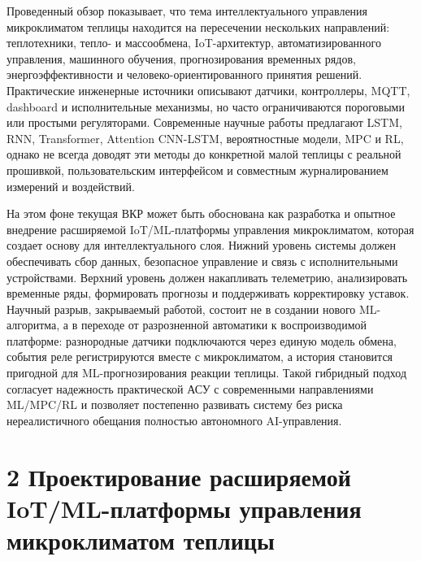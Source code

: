 \documentclass[a4paper,14pt]{extarticle}
\begin{document}
Проведенный обзор показывает, что тема интеллектуального управления
микроклиматом теплицы находится на пересечении нескольких направлений:
теплотехники, тепло- и массообмена, IoT-архитектур, автоматизированного
управления, машинного обучения, прогнозирования временных рядов,
энергоэффективности и человеко-ориентированного принятия решений.
Практические инженерные источники описывают датчики, контроллеры, MQTT,
dashboard и исполнительные механизмы, но часто ограничиваются пороговыми
или простыми регуляторами. Современные научные работы предлагают LSTM,
RNN, Transformer, Attention CNN-LSTM, вероятностные модели, MPC и RL,
однако не всегда доводят эти методы до конкретной малой теплицы с
реальной прошивкой, пользовательским интерфейсом и совместным
журналированием измерений и воздействий.

На этом фоне текущая ВКР может быть обоснована как разработка и опытное
внедрение расширяемой IoT/ML-платформы управления микроклиматом, которая
создает основу для интеллектуального слоя. Нижний уровень системы должен
обеспечивать сбор данных, безопасное управление и связь с
исполнительными устройствами. Верхний уровень должен накапливать
телеметрию, анализировать временные ряды, формировать прогнозы и
поддерживать корректировку уставок. Научный разрыв, закрываемый работой,
состоит не в создании нового ML-алгоритма, а в переходе от разрозненной
автоматики к воспроизводимой платформе: разнородные датчики подключаются
через единую модель обмена, события реле регистрируются вместе с
микроклиматом, а история становится пригодной для ML-прогнозирования
реакции теплицы. Такой гибридный подход согласует надежность
практической АСУ с современными направлениями ML/MPC/RL и позволяет
постепенно развивать систему без риска нереалистичного обещания
полностью автономного AI-управления.

\hypertarget{ux43fux440ux43eux435ux43aux442ux438ux440ux43eux432ux430ux43dux438ux435-ux440ux430ux441ux448ux438ux440ux44fux435ux43cux43eux439-iotml-ux43fux43bux430ux442ux444ux43eux440ux43cux44b-ux443ux43fux440ux430ux432ux43bux435ux43dux438ux44f-ux43cux438ux43aux440ux43eux43aux43bux438ux43cux430ux442ux43eux43c-ux442ux435ux43fux43bux438ux446ux44b}{%
\section{2 Проектирование расширяемой IoT/ML-платформы управления
микроклиматом
теплицы}\label{ux43fux440ux43eux435ux43aux442ux438ux440ux43eux432ux430ux43dux438ux435-ux440ux430ux441ux448ux438ux440ux44fux435ux43cux43eux439-iotml-ux43fux43bux430ux442ux444ux43eux440ux43cux44b-ux443ux43fux440ux430ux432ux43bux435ux43dux438ux44f-ux43cux438ux43aux440ux43eux43aux43bux438ux43cux430ux442ux43eux43c-ux442ux435ux43fux43bux438ux446ux44b}}
\end{document}

